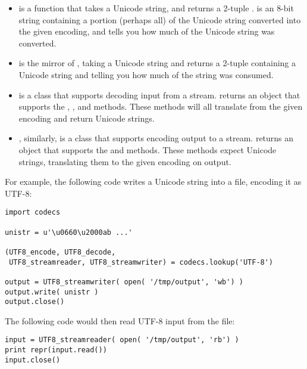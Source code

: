 \documentclass{howto}
\begin{document}
\begin{itemize}
\item {} is a function that takes a Unicode string, and
returns a 2-tuple .  
is an 8-bit string containing a portion (perhaps all) of the Unicode
string converted into the given encoding, and  tells you
how much of the Unicode string was converted.

\item {} is the mirror of , 
taking a Unicode string and
returns a 2-tuple  containing a Unicode string
and  telling you how much of the string was consumed.

\item {} is a class that supports decoding input from
a stream.   returns an object that
supports the , , and
 methods.  These methods will all translate from
the given encoding and return Unicode strings.

\item {}, similarly, is a class that supports
encoding output to a stream.  
returns an object that supports the  and
 methods.  These methods expect Unicode strings,
translating them to the given encoding on output.
\end{itemize}

For example, the following code writes a Unicode string into a file, 
encoding it as UTF-8:

\begin{verbatim}
import codecs

unistr = u'\u0660\u2000ab ...'

(UTF8_encode, UTF8_decode,
 UTF8_streamreader, UTF8_streamwriter) = codecs.lookup('UTF-8')

output = UTF8_streamwriter( open( '/tmp/output', 'wb') )
output.write( unistr )
output.close()
\end{verbatim}

The following code would then read UTF-8 input from the file:

\begin{verbatim}
input = UTF8_streamreader( open( '/tmp/output', 'rb') )
print repr(input.read())
input.close()
\end{verbatim}
\end{document}

